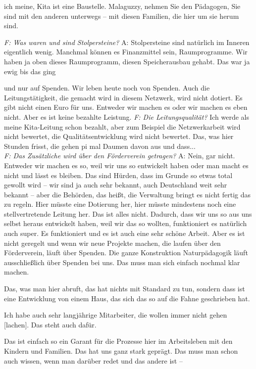 \begin{linenumbers*}
ich meine, Kita ist eine Baustelle. Malaguzzy, nehmen Sie den Pädagogen, Sie sind mit den anderen unterwegs -- mit diesen Familien, die hier um sie herum sind. 

\emph{F: Was waren und sind Stolpersteine?}
A: Stolpersteine sind natürlich im Inneren eigentlich wenig. Manchmal können es Finanzmittel sein, Raumprogramme. Wir haben ja oben dieses Raumprogramm, diesen Speicherausbau gehabt. Das war ja ewig bis das ging 

und nur auf Spenden. Wir leben heute noch von Spenden. Auch die Leitungstätigkeit, die gemacht wird in diesem Netzwerk, wird nicht dotiert. Es gibt nicht einen Euro für uns. Entweder wir machen es oder wir machen es eben nicht. Aber es ist keine bezahlte Leistung.          
\emph{F: Die Leitungsqualität?}
Ich werde als meine Kita-Leitung schon bezahlt, aber zum Beispiel die Netzwerkarbeit wird nicht bewertet, die Qualitätsentwicklung wird nicht bewertet. Das, was hier Stunden frisst, die gehen pi mal Daumen davon aus und dass...\\
\emph{F: Das Zusätzliche wird über den Förderverein getragen?}
A: Nein, gar nicht. 
Entweder wir machen es so, weil wir uns so entwickelt haben oder man macht es nicht und lässt es bleiben. Das sind Hürden, dass im Grunde so etwas total gewollt wird -- wir sind ja auch sehr bekannt, auch Deutschland weit sehr bekannt -- aber die Behörden, das heißt, die Verwaltung bringt es nicht fertig das zu regeln. Hier müsste eine Dotierung her, hier müsste mindestens noch eine stellvertretende Leitung her. Das ist alles nicht. Dadurch, dass wir uns so aus uns selbst heraus entwickelt haben, weil wir das so wollten, funktioniert es natürlich auch super. Es funktioniert und es ist auch eine sehr schöne Arbeit. Aber es ist nicht geregelt und wenn wir neue Projekte machen, die laufen über den Förderverein, läuft über Spenden. Die ganze Konstruktion Naturpädagogik läuft ausschließlich über Spenden bei uns.
Das muss man sich einfach nochmal klar machen. 

Das, was man hier abruft, das hat nichts mit Standard zu tun, sondern dass ist eine Entwicklung von einem Haus, das sich das so auf die Fahne geschrieben hat.
 
Ich habe auch sehr langjährige Mitarbeiter, die wollen immer nicht gehen [lachen]. Das steht auch dafür. 

Das ist einfach so ein Garant für die Prozesse hier im Arbeitsleben mit den Kindern und Familien. Das hat uns ganz stark geprägt. Das muss man schon auch wissen, wenn man darüber redet und das andere ist -- 


\end{linenumbers*}
